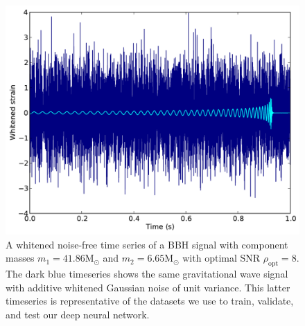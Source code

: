 \documentclass[%
showpacs,
 amsmath,amssymb,
 aps,
 twocolumn,
 prl,
 reprint,
floatfix,
]{revtex4-1}
\newcommand{\optsnr}{\rho_{\mathrm{opt}}}
\begin{document}
\begin{figure} 
\includegraphics[width=\columnwidth]{figures/waveform.pdf}
\caption{A whitened noise-free time series of a \ac{BBH}
signal with component masses $m_{1}=41.86\mathrm{M}_{\odot}$ and
$m_{2}=6.65\mathrm{M}_{\odot}$ with optimal \ac{SNR} $\optsnr=8$. The dark blue
timeseries shows the same gravitational wave signal with additive whitened
Gaussian noise of unit variance. This latter timeseries is representative of
the datasets we use to train, validate, and test our deep neural network.\label{fig:waveform}}
\end{figure}
\end{document}

